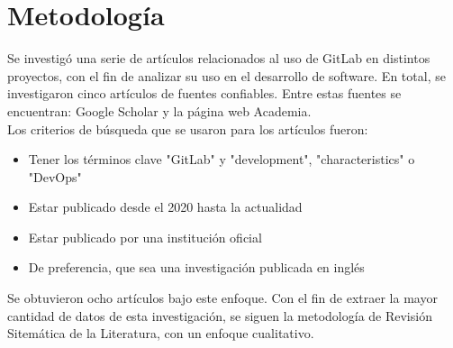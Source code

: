 \documentclass[runningheads]{llncs}
\begin{document}
\section{Metodología}
Se investigó una serie de artículos relacionados al uso de GitLab en distintos proyectos, con el fin
de analizar su uso en el desarrollo de software. En total, se investigaron cinco artículos de fuentes confiables.
Entre estas fuentes se encuentran: Google Scholar y la página web Academia.\\
Los criterios de búsqueda que se usaron para los artículos fueron:
\begin{itemize}
        \item Tener los términos clave "GitLab" y "development", "characteristics" o "DevOps"
        \item Estar publicado desde el 2020 hasta la actualidad
        \item Estar publicado por una institución oficial
        \item De preferencia, que sea una investigación publicada en inglés
\end{itemize}
Se obtuvieron ocho artículos bajo este enfoque. Con el fin de extraer la mayor cantidad de datos de
esta investigación, se siguen la metodología de Revisión Sitemática de la Literatura, con un enfoque
cualitativo.
\end{document}
